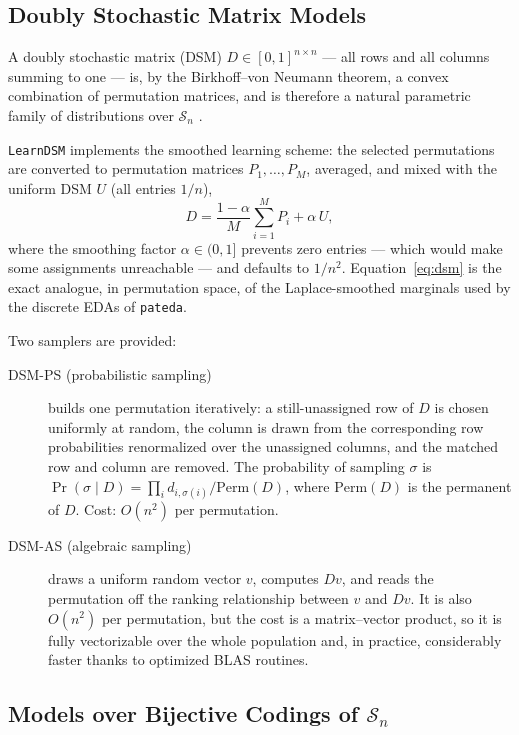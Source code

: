 \documentclass[a4paper,11pt]{article}
\begin{document}
\subsection{Doubly Stochastic Matrix Models}

A doubly stochastic matrix (DSM) $D \in [0,1]^{n\times n}$ --- all rows and all
columns summing to one --- is, by the Birkhoff--von Neumann theorem, a convex
combination of permutation matrices, and is therefore a natural parametric family
of distributions over $\mathcal{S}_n$ \citep{Santucci_and_Ceberio:2023}.

\texttt{LearnDSM} implements the smoothed learning scheme: the selected
permutations are converted to permutation matrices $P_1,\ldots,P_M$, averaged,
and mixed with the uniform DSM $U$ (all entries $1/n$),
\begin{equation}
D = \frac{1-\alpha}{M}\sum_{i=1}^{M} P_i + \alpha\, U ,
\label{eq:dsm}
\end{equation}
where the smoothing factor $\alpha \in (0,1]$ prevents zero entries --- which
would make some assignments unreachable --- and defaults to $1/n^2$.
Equation~\eqref{eq:dsm} is the exact analogue, in permutation space, of the
Laplace-smoothed marginals used by the discrete EDAs of \texttt{pateda}.

Two samplers are provided:

\begin{description}
  \item[DSM-PS (probabilistic sampling)] builds one permutation iteratively: a
    still-unassigned row of $D$ is chosen uniformly at random, the column is
    drawn from the corresponding row probabilities renormalized over the
    unassigned columns, and the matched row and column are removed.  The
    probability of sampling $\sigma$ is
    $\Pr(\sigma \mid D) = \prod_i d_{i,\sigma(i)} / \mathrm{Perm}(D)$, where
    $\mathrm{Perm}(D)$ is the permanent of $D$.  Cost: $O(n^2)$ per permutation.
  \item[DSM-AS (algebraic sampling)] draws a uniform random vector $v$, computes
    $Dv$, and reads the permutation off the ranking relationship between $v$ and
    $Dv$.  It is also $O(n^2)$ per permutation, but the cost is a matrix--vector
    product, so it is fully vectorizable over the whole population and, in
    practice, considerably faster thanks to optimized BLAS routines.
\end{description}

\subsection{\texorpdfstring{Models over Bijective Codings of $\mathcal{S}_n$}{Models over Bijective Codings of Sn}}
\label{sec:representations}
\end{document}
